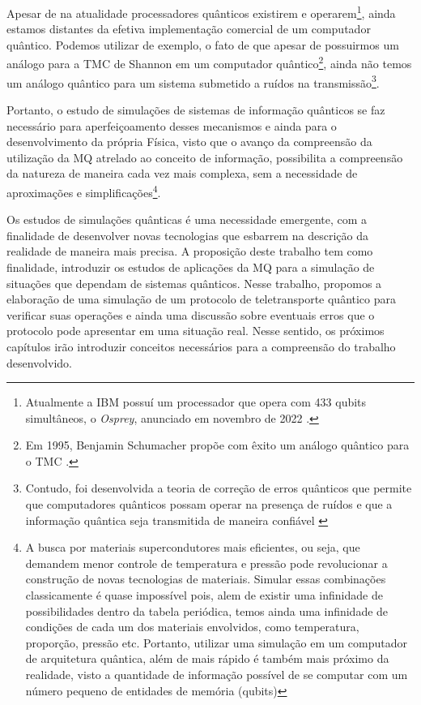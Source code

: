 Apesar de na atualidade processadores quânticos existirem e operarem\footnote{Atualmente a IBM possuí um processador que opera com 433 qubits simultâneos, o \textit{Osprey}, anunciado em novembro de 2022 \cite{osprey}.}, ainda estamos distantes da efetiva implementação comercial de um computador quântico. Podemos utilizar de exemplo, o fato de que apesar de possuirmos um análogo para a TMC de Shannon em um computador quântico\footnote{Em 1995, Benjamin Schumacher propõe com êxito um análogo quântico para o TMC \cite{benschu}.}, ainda não temos um análogo quântico para um sistema submetido a ruídos na transmissão\footnote{Contudo, foi desenvolvida a teoria de correção de erros quânticos que permite que computadores quânticos possam operar na presença de ruídos e que a informação quântica seja transmitida de maneira confiável \cite{chuang}}\cite{chuang}.

Portanto, o estudo de simulações de sistemas de informação quânticos se faz necessário para aperfeiçoamento desses mecanismos e ainda para o desenvolvimento da própria Física, visto que o avanço da compreensão da utilização da MQ atrelado ao conceito de informação, possibilita a compreensão da natureza de maneira cada vez mais complexa, sem a necessidade de aproximações e simplificações\footnote{A busca por materiais supercondutores mais eficientes, ou seja, que demandem menor controle de temperatura e pressão pode revolucionar a construção de novas tecnologias de materiais. Simular essas combinações classicamente é quase impossível pois, alem de existir uma infinidade de possibilidades dentro da tabela periódica, temos ainda uma infinidade de condições de cada um dos materiais envolvidos, como temperatura, proporção, pressão etc. Portanto, utilizar uma simulação em um computador de arquitetura quântica, além de mais rápido é também mais próximo da realidade, visto a quantidade de informação possível de se computar com um número pequeno de entidades de memória (qubits)\cite{videoyoutube}}\cite{videoyoutube}.

Os estudos de simulações quânticas é uma necessidade emergente, com a finalidade de desenvolver novas tecnologias que esbarrem na descrição da realidade de maneira mais precisa. A proposição deste trabalho tem como finalidade, introduzir os estudos de aplicações da MQ para a simulação de situações que dependam de sistemas quânticos. Nesse trabalho, propomos a elaboração de uma simulação de um protocolo de teletransporte quântico para verificar suas operações e ainda uma discussão sobre eventuais erros que o protocolo pode apresentar em uma situação real. Nesse sentido, os próximos capítulos irão introduzir conceitos necessários para a compreensão do trabalho desenvolvido.

\clearpage
